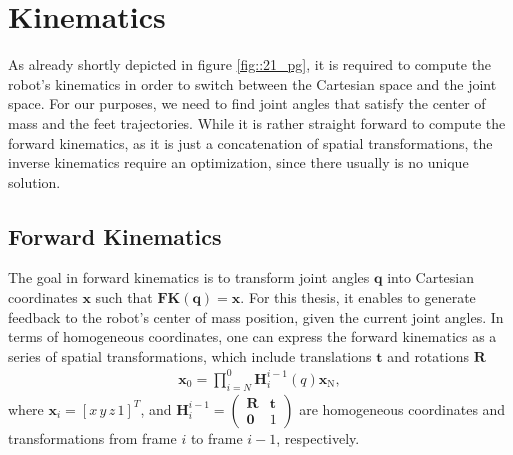 \FloatBarrier
\section{Kinematics}
\label{sec::24_k}
As already shortly depicted in figure \ref{fig::21_pg}, it is required to compute the robot's kinematics in order to switch between the Cartesian space and the joint space. For our purposes, we need to find joint angles that satisfy the center of mass and the feet trajectories. While it is rather straight forward to compute the forward kinematics, as it is just a concatenation of spatial transformations, the inverse kinematics require an optimization, since there usually is no unique solution.
\FloatBarrier
\subsection{Forward Kinematics}
\label{sec::241_fk}
The goal in forward kinematics is to transform joint angles $\bm{q}$ into Cartesian coordinates $\bm{x}$ such that $\textbf{FK}(\bm{q}) = \bm{x}$. For this thesis, it enables to generate feedback to the robot's center of mass position, given the current joint angles. In terms of homogeneous coordinates, one can express the forward kinematics as a series of spatial transformations, which include translations $\bm{t}$ and rotations $\bm{R}$ 
\begin{align}
	\bm{x}_\text{0} = \prod_{i=N}^{0}\bm{H}_i^{i-1}(q)\bm{x}_\text{N},
\end{align}
where $\bm{x}_i=[x\,y\,z\,1]^T$, and $\bm{H}_i^{i-1}=\begin{pmatrix}\bm{R} & \bm{t} \\ \bm{0} & 1 \end{pmatrix}$ are homogeneous coordinates and transformations from frame $i$ to frame $i-1$, respectively.
\FloatBarrier

